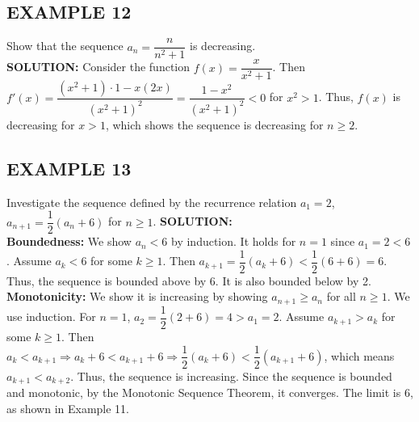 \documentclass{article}
\theoremstyle{mystyle}
\begin{document}
\subsection*{EXAMPLE 12}
Show that the sequence \(a_n = \dfrac{n}{n^2+1}\) is decreasing.\\
\textbf{SOLUTION:}
Consider the function \(f(x) = \dfrac{x}{x^2+1}\). Then \(f'(x) = \dfrac{(x^2+1) \cdot 1 - x(2x)}{(x^2+1)^2} = \dfrac{1-x^2}{(x^2+1)^2} < 0\) for \(x^2>1\). Thus, \(f(x)\) is decreasing for \(x>1\), which shows the sequence is decreasing for \(n \ge 2\).

\subsection*{EXAMPLE 13}
Investigate the sequence defined by the recurrence relation \(a_1 = 2\), \(a_{n+1} = \dfrac{1}{2}(a_n+6)\) for \(n \ge 1\).
\textbf{SOLUTION:} \\
\textbf{Boundedness:} We show \(a_n < 6\) by induction. It holds for \(n=1\) since \(a_1 = 2 < 6\). Assume \(a_k < 6\) for some \(k \ge 1\). Then \(a_{k+1} = \dfrac{1}{2}(a_k+6) < \dfrac{1}{2}(6+6) = 6\). Thus, the sequence is bounded above by 6. It is also bounded below by 2. \\
\textbf{Monotonicity:} We show it is increasing by showing \(a_{n+1} \ge a_n\) for all \(n \ge 1\). We use induction. For \(n=1\), \(a_2 = \dfrac{1}{2}(2+6)=4 > a_1=2\). Assume \(a_{k+1} > a_k\) for some \(k \ge 1\). Then \(a_k < a_{k+1} \Rightarrow a_k+6 < a_{k+1}+6 \Rightarrow \dfrac{1}{2}(a_k+6) < \dfrac{1}{2}(a_{k+1}+6)\), which means \(a_{k+1} < a_{k+2}\). Thus, the sequence is increasing.
Since the sequence is bounded and monotonic, by the Monotonic Sequence Theorem, it converges. The limit is 6, as shown in Example 11.
\end{document}
